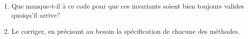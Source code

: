 \documentclass[a4paper,17pt]{extarticle}
\newenvironment{eleve}%
{\begin{activite}\color{noiramu}\\[-0.5cm]}
{\end{activite}}
\providecommand{\tightlist}{%
      \setlength{\itemsep}{0pt}\setlength{\parskip}{0pt}}
\begin{document}
\begin{eleve}
\begin{enumerate}
\def\labelenumi{\arabic{enumi}.}
\tightlist
\item
  Que manque-t-il à ce code pour que ces invariants soient bien toujours
  valides quoiqu'il arrive?
\item
  Le corriger, en précisant au besoin la spécification de chacune des
  méthodes.
\end{enumerate}
        
        \end{eleve}

    
    
    
\end{document}
